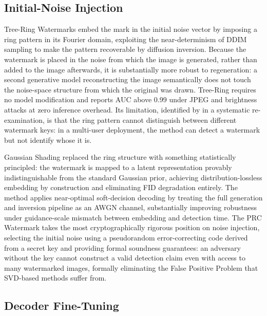 ﻿\documentclass[12pt, a4paper, twoside]{report}
\numberwithin{equation}{chapter}
\begin{document}
\subsection*{Initial-Noise Injection}

Tree-Ring Watermarks \cite{wen2023} embed the mark in the initial noise vector by imposing a ring pattern in its Fourier domain, exploiting the near-determinism of DDIM sampling to make the pattern recoverable by diffusion inversion. Because the watermark is placed in the noise from which the image is generated, rather than added to the image afterwards, it is substantially more robust to regeneration: a second generative model reconstructing the image semantically does not touch the noise-space structure from which the original was drawn. Tree-Ring requires no model modification and reports AUC above 0.99 under JPEG and brightness attacks at zero inference overhead. Its limitation, identified by \cite{ci2024} in a systematic re-examination, is that the ring pattern cannot distinguish between different watermark keys: in a multi-user deployment, the method can detect a watermark but not identify whose it is.

Gaussian Shading \cite{yang2024} replaced the ring structure with something statistically principled: the watermark is mapped to a latent representation provably indistinguishable from the standard Gaussian prior, achieving distribution-lossless embedding by construction and eliminating FID degradation entirely. The method applies near-optimal soft-decision decoding by treating the full generation and inversion pipeline as an AWGN channel, substantially improving robustness under guidance-scale mismatch between embedding and detection time. The PRC Watermark \cite{gunn2024} takes the most cryptographically rigorous position on noise injection, selecting the initial noise using a pseudorandom error-correcting code derived from a secret key and providing formal soundness guarantees: an adversary without the key cannot construct a valid detection claim even with access to many watermarked images, formally eliminating the False Positive Problem that SVD-based methods suffer from.

\subsection*{Decoder Fine-Tuning}
\end{document}
